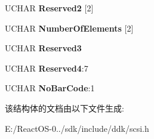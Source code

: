 \begin{DoxyCompactItemize}
U\+C\+H\+AR {\bfseries Reserved2} \mbox{[}2\mbox{]}
\item 
\mbox{\label{struct___c_d_b_1_1___i_n_i_t_i_a_l_i_z_e___e_l_e_m_e_n_t___r_a_n_g_e_af2a12323f525c067372ab38b265ced29}} 
U\+C\+H\+AR {\bfseries Number\+Of\+Elements} \mbox{[}2\mbox{]}
\item 
\mbox{\label{struct___c_d_b_1_1___i_n_i_t_i_a_l_i_z_e___e_l_e_m_e_n_t___r_a_n_g_e_af68820976b02ec6db1ba237c9742a894}} 
U\+C\+H\+AR {\bfseries Reserved3}
\item 
\mbox{\label{struct___c_d_b_1_1___i_n_i_t_i_a_l_i_z_e___e_l_e_m_e_n_t___r_a_n_g_e_a84f2b85c512baba7c9fe102f3e9136e9}} 
U\+C\+H\+AR {\bfseries Reserved4}\+:7
\item 
\mbox{\label{struct___c_d_b_1_1___i_n_i_t_i_a_l_i_z_e___e_l_e_m_e_n_t___r_a_n_g_e_a4a99834f6ddd7c71b5694d5b9f066cc2}} 
U\+C\+H\+AR {\bfseries No\+Bar\+Code}\+:1
\end{DoxyCompactItemize}


该结构体的文档由以下文件生成\+:\begin{DoxyCompactItemize}
\item 
E\+:/\+React\+O\+S-\/0../sdk/include/ddk/scsi.\+h\end{DoxyCompactItemize}
